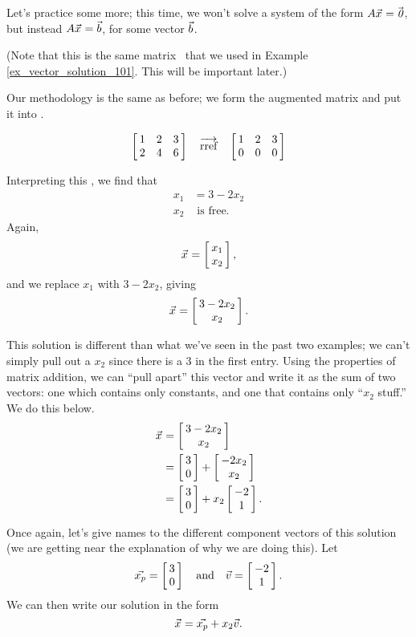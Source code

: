 Let's practice some more; this time, we won't solve a system of the form $\tta\vx=\zero$, but instead $\ttaxb$, for some vector $\vb$.\\

{(Note that this is the same matrix \tta\ that we used in Example \ref{ex_vector_solution_101}. This will be important later.)

Our methodology is the same as before; we form the augmented matrix and put it into \rref.

$$\bmx{ccc} 1&2&3\\2&4&6\emx \quad \arref \quad \bmx{ccc} 1&2&3\\0&0&0\emx$$

Interpreting this \rref, we find that \begin{align*} x_1 &= 3-2x_2\\ x_2 &\text{ is free.} \end{align*} Again, $$\vx = \bmx{c} x_1\\x_2\emx,$$  and we replace $x_1$ with $3-2x_2$, giving $$\vx = \bmx{c} 3-2x_2\\x_2\emx.$$


\drawexampleline
This solution is different than what we've seen in the past two examples; we can't simply pull out a $x_2$ since there is a 3 in the first entry. Using the properties of matrix addition, we can ``pull apart'' this vector and write it as the sum of two vectors: one which contains only constants, and one that contains only ``$x_2$ stuff.'' We do this below. 
\begin{align*} 
\vx &= \bmx{c}3-2x_2\\x_2\emx \\
		&= \bmx{c} 3\\0\emx + \bmx{c} -2x_2\\x_2\emx\\
		&= \bmx{c} 3\\0\emx + x_2\bmx{c}-2\\1\emx.
\end{align*}

Once again, let's give names to the different component vectors of this solution (we are getting near the explanation of why we are doing this). Let $$\vect{x_p} = \bmx{c} 3\\0\emx \quad \text{and} \quad \vv = \bmx{c}-2\\1\emx.$$ We can then write our solution in the form $$\vx = \vect{x_p} + x_2\vv.$$

}
